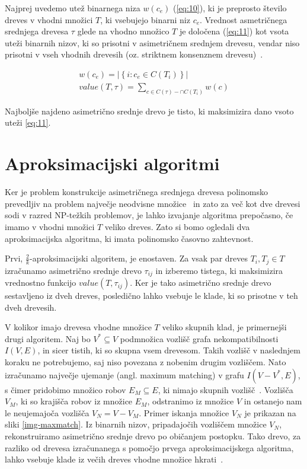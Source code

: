 \documentclass[a4paper, 12pt]{book}
\begin{document}
Najprej uvedemo utež binarnega niza $w(c_e)$ (\ref{eq:10}), ki je preprosto število dreves v vhodni množici $T$, ki vsebujejo binarni niz $c_e$. Vrednost asmetričnega srednjega drevesa $\tau$ glede na vhodno množico $T$ je določena (\ref{eq:11}) kot vsota uteži binarnih nizov, ki so prisotni v asimetričnem srednjem drevesu, vendar niso prisotni v vseh vhodnih drevesih (oz. striktnem konsenznem drevesu)~\cite{pw}.

\begin{align}
	w(c_e) = \left| \left\{ i: c_e \in C(T_i) \right\} \right| \label{eq:10} \\
	value(T, \tau) = \sum_{c \in C(\tau) - \cap C(T_i)} w(c) \label{eq:11}
\end{align}

Najboljše najdeno asimetrično srednje drevo je tisto, ki maksimizira dano vsoto uteži \ref{eq:11}.

\section{Aproksimacijski algoritmi}
Ker je problem konstrukcije asimetričnega srednjega drevesa polinomsko prevedljiv na problem največje neodvisne množice~\cite{pw} in zato za več kot dve drevesi sodi v razred NP-težkih problemov, je lahko izvajanje algoritma prepočasno, če imamo v vhodni množici $T$ veliko dreves. Zato si bomo ogledali dva aproksimacijska algoritma, ki imata polinomsko časovno zahtevnost.

Prvi, $\frac{2}{k}$-aproksimacijski algoritem, je enostaven. Za vsak par dreves $T_i, T_j \in T$ izračunamo asimetrično srednje drevo $\tau_{ij}$ in izberemo tistega, ki maksimizira vrednostno funkcijo $value(T, \tau_{ij})$. Ker je tako asimetrično srednje drevo sestavljeno iz dveh dreves, posledično lahko vsebuje le klade, ki so prisotne v teh dveh drevesih.

V kolikor imajo drevesa vhodne množice $T$ veliko skupnih klad, je primernejši drugi algoritem. Naj bo $V^* \subseteq V$ podmnožica vozlišč grafa nekompatibilnosti $I(V, E)$, in sicer tistih, ki so skupna vsem drevesom. Takih vozlišč v naslednjem koraku ne potrebujemo, saj niso povezana z nobenim drugim vozliščem. Nato izračunamo največje ujemanje (angl. maximum matching) v grafu $I(V - V^*, E)$, s čimer pridobimo množico robov $E_{M} \subseteq E$, ki nimajo skupnih vozlišč~\cite{mgt}. Vozlišča $V_{M}$, ki so krajišča robov iz množice $E_{M}$, odstranimo iz množice $V$ in ostanejo nam le neujemajoča vozlišča $V_{N} = V - V_{M}$. Primer iskanja množice $V_N$ je prikazan na sliki \ref{img-maxmatch}. Iz binarnih nizov, pripadajočih vozliščem množice $V_{N}$, rekonstruiramo asimetrično srednje drevo po običanjem postopku. Tako drevo, za razliko od drevesa izračunanega s pomočjo prvega aproksimacijskega algoritma, lahko vsebuje klade iz večih dreves vhodne množice hkrati~\cite{pw}. 
\end{document}
